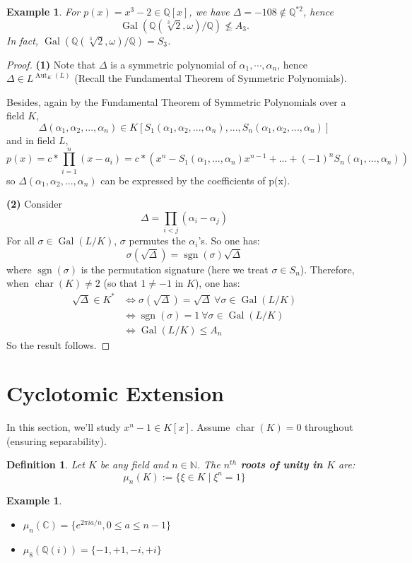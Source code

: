 \documentclass[11pt]{book}
\newtheorem{definition}[theorem]{Definition}
\newtheorem{example}[theorem]{Example}
\begin{document}
\begin{example}
For $ p(x) = x^3 - 2 \in \mathbb{Q}[x] $, we have $ \Delta = -108 \notin \mathbb{Q}^{*2} $, hence
$$
\operatorname{Gal}(\mathbb{Q}(\sqrt[3]{2}, \omega)/\mathbb{Q}) \nleq A_3.
$$
In fact, $ \operatorname{Gal}(\mathbb{Q}(\sqrt[3]{2}, \omega)/\mathbb{Q}) = S_3 $.
\end{example}

\begin{proof}
    \textbf{(1)} Note that $\Delta$ is a symmetric polynomial of ${\alpha_1,\cdots,\alpha_n}$, hence $\Delta\in L^{\operatorname{Aut}_K(L)}$ (Recall the Fundamental Theorem of Symmetric Polynomials). 
    
    Besides, again by the Fundamental Theorem of Symmetric Polynomials over a field $K$, \[\Delta(\alpha_1, \alpha_2, ..., \alpha_n) \in K[S_1(\alpha_1, \alpha_2, ..., \alpha_n), ..., S_n(\alpha_1, \alpha_2, ..., \alpha_n)]\] 
    and in field $L$, \[p(x) = c*\prod_{i=1}^{n} (x-a_i) = c*(x^n - S_1(\alpha_1, ..., \alpha_n)x^{n-1}+...+(-1)^n S_n(\alpha_1, ..., \alpha_n))\] so $\Delta(\alpha_1, \alpha_2, ..., \alpha_n)$ can be expressed by the coefficients of p(x). 
    
\textbf{(2)} Consider
$$
\Delta = \prod_{i<j} (\alpha_i - \alpha_j)
$$
For all $\sigma \in \operatorname{Gal}(L/K)$, $\sigma$ permutes the $\alpha_i$'s. So one has:
$$
\sigma(\sqrt{\Delta}) = \operatorname{sgn}(\sigma)\sqrt{\Delta}
$$
where $\operatorname{sgn}(\sigma)$ is the permutation signature (here we treat $\sigma \in S_n$). Therefore, when $\operatorname{char}(K) \neq 2$ (so that $1 \neq -1$ in $K$), one has:
\begin{align*}
    \sqrt{\Delta} \in K^* &\iff \sigma(\sqrt{\Delta}) = \sqrt{\Delta}\ \forall \sigma \in  \operatorname{Gal}(L/K)\\ 
    &\iff \operatorname{sgn}(\sigma) = 1\ \forall \sigma \in \operatorname{Gal}(L/K)\\ 
    &\iff \operatorname{Gal}(L/K) \leq A_n
\end{align*}
So the result follows.
\end{proof}

\section{Cyclotomic Extension}  
In this section, we'll study $ x^n - 1 \in K[x] $. Assume $\operatorname{char}(K) = 0$ throughout (ensuring separability).

\begin{definition}
Let $ K $ be any field and $ n \in \mathbb{N} $. The {\bf $n^{th}$ roots of unity in $ K $} are:
$$
\mu_n(K) := \{ \xi \in K \mid \xi^n = 1 \}
$$
\end{definition}
\begin{example}
    \begin{itemize}
        \item $\mu_n(\mathbb{C})=\{e^{2\pi i a/n},0\leq a\leq n-1\}$
        \item $\mu_8(\mathbb{Q}(i))=\{-1,+1,-i,+i\}$
    \end{itemize}
\end{example}
\end{document}
